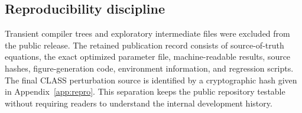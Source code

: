 \subsection{Reproducibility discipline}
Transient compiler trees and exploratory intermediate files were excluded from the public release. The retained publication record consists of source-of-truth equations, the exact optimized parameter file, machine-readable results, source hashes, figure-generation code, environment information, and regression scripts. The final CLASS perturbation source is identified by a cryptographic hash given in Appendix~\ref{app:repro}. This separation keeps the public repository testable without requiring readers to understand the internal development history.
